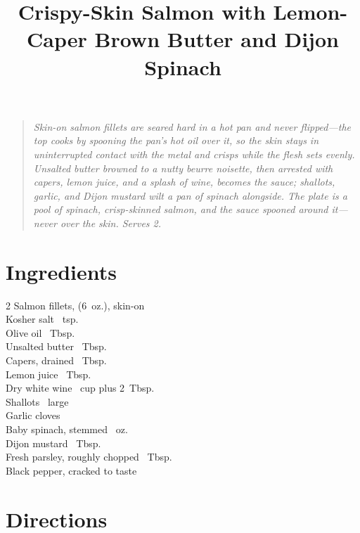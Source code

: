 \documentclass[11pt,letterpaper]{article}
\title{Crispy-Skin Salmon with Lemon-Caper Brown Butter and Dijon Spinach}
\author{}
\date{}
\begin{document}
\maketitle
\thispagestyle{empty}

\begin{quote}\textit{Skin-on salmon fillets are seared hard in a hot pan and never flipped---the top cooks by spooning the pan's hot oil over it, so the skin stays in uninterrupted contact with the metal and crisps while the flesh sets evenly. Unsalted butter browned to a nutty \textit{beurre noisette}, then arrested with capers, lemon juice, and a splash of wine, becomes the sauce; shallots, garlic, and Dijon mustard wilt a pan of spinach alongside. The plate is a pool of spinach, crisp-skinned salmon, and the sauce spooned around it---never over the skin. Serves 2.}\end{quote}

\section*{Ingredients}
\setlength{\columnsep}{20pt}
\begin{multicols}{2}
\noindent
    Salmon fillets, (6~oz.), skin-on  \\
    Kosher salt ~tsp. \\
    Olive oil ~Tbsp. \\
    Unsalted butter ~Tbsp. \\
    Capers, drained ~Tbsp. \\
    Lemon juice ~Tbsp. \\

    \columnbreak
    \noindent
    Dry white wine \dotfill {}~cup plus 2~Tbsp. \\
    Shallots ~large \\
    Garlic cloves  \\
    Baby spinach, stemmed ~oz. \\
    Dijon mustard ~Tbsp. \\
    Fresh parsley, roughly chopped ~Tbsp. \\
    Black pepper, cracked \dotfill to taste \\
\end{multicols}

\section*{Directions}
\end{document}
